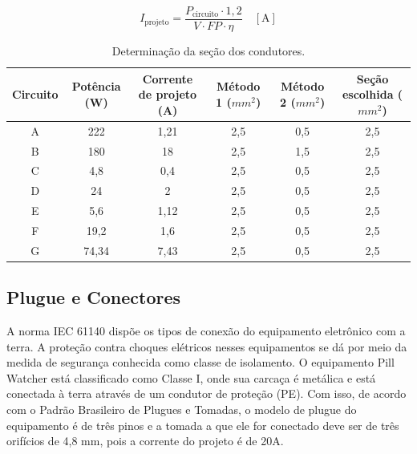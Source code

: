     \begin{equation}
        I_\text{projeto} = \frac{P_\text{circuito} \cdot 1,2}{V \cdot FP \cdot \eta} \quad [\text{A}]
        \label{energia_corrente1}
    \end{equation}

\begin{table}[H]
    \centering
    \footnotesize
    \caption{Determinação da seção dos condutores.}
    \label{energia_seção}
    \begin{adjustbox}{max width = \textwidth}
        \begin{tabular}{|c|c|c|c|c|c|}
            \hline
            \rowcolor[HTML]{A8DADC}
            Circuito & Potência (W) & Corrente de projeto (A) & Método 1 ($mm^{2}$)& Método 2 ($mm^{2}$)& Seção escolhida ($mm^{2}$)
            \\ \hline
            A  & 222 & 1,21 & 2,5 & 0,5 & 2,5
            \\ \hline
             B & 180 & 18 & 2,5 & 1,5 & 2,5
            \\ \hline
             C & 4,8 & 0,4 & 2,5 & 0,5 & 2,5
            \\ \hline
             D & 24 & 2 & 2,5 & 0,5 & 2,5
            \\ \hline
             E & 5,6 & 1,12 & 2,5 & 0,5 & 2,5
            \\ \hline
             F & 19,2 & 1,6 & 2,5 & 0,5 & 2,5
            \\ \hline
             G & 74,34 & 7,43 & 2,5 & 0,5 & 2,5
            \\ \hline
        \end{tabular}
    \end{adjustbox}
\end{table}

\subsection{Plugue e Conectores}

A norma IEC 61140 dispõe os tipos de conexão do equipamento eletrônico com a terra. A proteção contra choques elétricos nesses equipamentos se dá por meio da medida de segurança conhecida como classe de isolamento. O equipamento Pill Watcher está classificado como Classe I, onde sua carcaça é metálica e está conectada à terra através de um condutor de proteção (PE). Com isso, de acordo com o Padrão Brasileiro de Plugues e Tomadas, o modelo de plugue do equipamento é de três pinos e a tomada a que ele for conectado deve ser de três orifícios de 4,8 mm, pois a corrente do projeto é de 20A.

